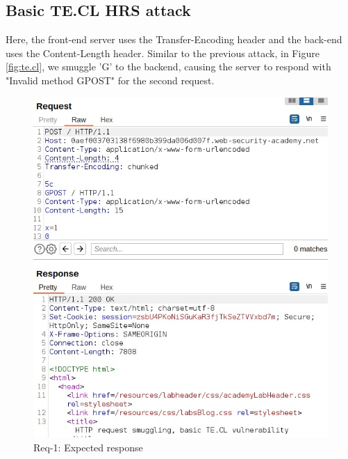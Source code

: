 \documentclass[conference]{IEEEtran}
\begin{document}
\subsection*{Basic TE.CL HRS attack}
Here, the front-end server uses the Transfer-Encoding header and the back-end uses the Content-Length header. Similar to the previous attack, in Figure \ref*{fig:te.cl}, we smuggle 'G' to the backend, causing the server to respond with "Invalid method GPOST" for the second request.

\begin{figure}[htbp]
	\centering
	\begin{minipage}[c]{0.45\linewidth}
	  \centering
	  \includegraphics[width=\linewidth]{results/TE.CL_req1_OK_response.jpeg}
	  \caption*{Req-1: Expected response}
	  \label{fig:te.cl_req1_ok}
	\end{minipage}
	\hfill
	\begin{minipage}[c]{0.45\linewidth}
	  \centering

\end{minipage}
\end{figure}
\end{document}
